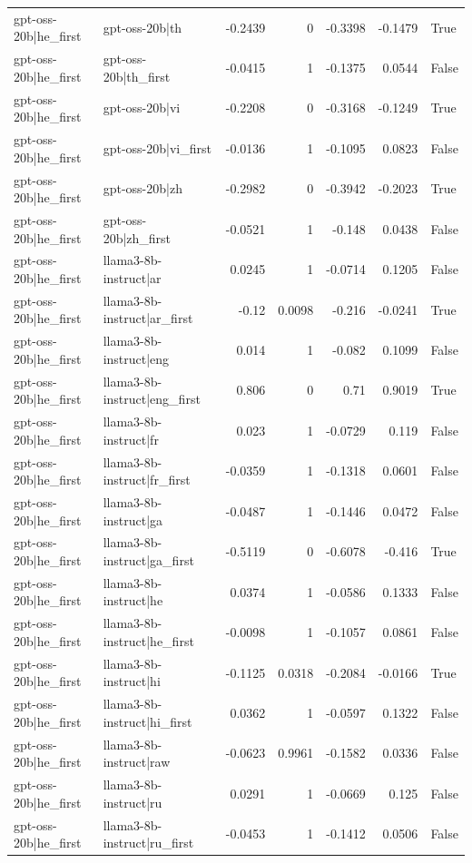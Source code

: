 \begin{table}
\begin{tabular}{l l r r r r l}
gpt-oss-20b|he_first & gpt-oss-20b|th & -0.2439 & 0 & -0.3398 & -0.1479 & True \\
gpt-oss-20b|he_first & gpt-oss-20b|th_first & -0.0415 & 1 & -0.1375 & 0.0544 & False \\
gpt-oss-20b|he_first & gpt-oss-20b|vi & -0.2208 & 0 & -0.3168 & -0.1249 & True \\
gpt-oss-20b|he_first & gpt-oss-20b|vi_first & -0.0136 & 1 & -0.1095 & 0.0823 & False \\
gpt-oss-20b|he_first & gpt-oss-20b|zh & -0.2982 & 0 & -0.3942 & -0.2023 & True \\
gpt-oss-20b|he_first & gpt-oss-20b|zh_first & -0.0521 & 1 & -0.148 & 0.0438 & False \\
gpt-oss-20b|he_first & llama3-8b-instruct|ar & 0.0245 & 1 & -0.0714 & 0.1205 & False \\
gpt-oss-20b|he_first & llama3-8b-instruct|ar_first & -0.12 & 0.0098 & -0.216 & -0.0241 & True \\
gpt-oss-20b|he_first & llama3-8b-instruct|eng & 0.014 & 1 & -0.082 & 0.1099 & False \\
gpt-oss-20b|he_first & llama3-8b-instruct|eng_first & 0.806 & 0 & 0.71 & 0.9019 & True \\
gpt-oss-20b|he_first & llama3-8b-instruct|fr & 0.023 & 1 & -0.0729 & 0.119 & False \\
gpt-oss-20b|he_first & llama3-8b-instruct|fr_first & -0.0359 & 1 & -0.1318 & 0.0601 & False \\
gpt-oss-20b|he_first & llama3-8b-instruct|ga & -0.0487 & 1 & -0.1446 & 0.0472 & False \\
gpt-oss-20b|he_first & llama3-8b-instruct|ga_first & -0.5119 & 0 & -0.6078 & -0.416 & True \\
gpt-oss-20b|he_first & llama3-8b-instruct|he & 0.0374 & 1 & -0.0586 & 0.1333 & False \\
gpt-oss-20b|he_first & llama3-8b-instruct|he_first & -0.0098 & 1 & -0.1057 & 0.0861 & False \\
gpt-oss-20b|he_first & llama3-8b-instruct|hi & -0.1125 & 0.0318 & -0.2084 & -0.0166 & True \\
gpt-oss-20b|he_first & llama3-8b-instruct|hi_first & 0.0362 & 1 & -0.0597 & 0.1322 & False \\
gpt-oss-20b|he_first & llama3-8b-instruct|raw & -0.0623 & 0.9961 & -0.1582 & 0.0336 & False \\
gpt-oss-20b|he_first & llama3-8b-instruct|ru & 0.0291 & 1 & -0.0669 & 0.125 & False \\
gpt-oss-20b|he_first & llama3-8b-instruct|ru_first & -0.0453 & 1 & -0.1412 & 0.0506 & False \\

\end{tabular}
\end{table}

